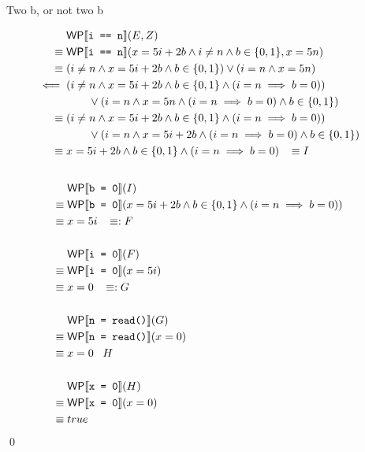 \documentclass[
  english
]{tumteaching}
\begin{document}
\begin{assignment}[L]{Two b, or not two b}
\begin{solution}
\begin{align*}
			&\;\textsf{WP}\llbracket{}\texttt{i == n}\rrbracket{}(E, Z)\\
			\equiv&\;\textsf{WP}\llbracket{}\texttt{i == n}\rrbracket{}(x = 5i + 2b \land i \neq n \land b \in \{ 0, 1 \}, x = 5n)\\
			\equiv&\;(i \neq n \land x = 5i + 2b \land b \in \{ 0, 1 \}) \lor (i = n \land x = 5n)\\
			\impliedby&\;(i \neq n \land x = 5i + 2b \land b \in \{ 0, 1 \} \land (i = n \implies b = 0))\\
			&\;\qquad \lor (i = n \land x = 5n \land (i = n \implies b = 0) \land b \in \{ 0, 1 \})\\
			\equiv&\;(i \neq n \land x = 5i + 2b \land b \in \{ 0, 1 \} \land (i = n \implies b = 0))\\
			&\;\qquad \lor (i = n \land x = 5i + 2b \land (i = n \implies b = 0) \land b \in \{ 0, 1 \})\\
			\equiv&\;x = 5i + 2b \land b \in \{ 0, 1 \} \land (i = n \implies b = 0) \;\;\; \equiv I\\
			&&\\
		\end{align*}
		\begin{align*}
			&\;\textsf{WP}\llbracket{}\texttt{b = 0}\rrbracket{}(I)\\
			\equiv&\;\textsf{WP}\llbracket{}\texttt{b = 0}\rrbracket{}(x = 5i + 2b \land b \in \{ 0, 1 \} \land (i = n \implies b = 0))\\
			\equiv&\;x = 5i \;\;\; \equiv: F\\
			&&\\
			&\;\textsf{WP}\llbracket{}\texttt{i = 0}\rrbracket{}(F)\\
			\equiv&\;\textsf{WP}\llbracket{}\texttt{i = 0}\rrbracket{}(x = 5i)\\
			\equiv&\;x = 0 \;\;\; \equiv: G\\
			&&\\
			&\;\textsf{WP}\llbracket{}\texttt{n = read()}\rrbracket{}(G)\\
			\equiv&\;\textsf{WP}\llbracket{}\texttt{n = read()}\rrbracket{}(x = 0)\\
			\equiv&\;x = 0 \;\;\; H\\
			&&\\
			&\;\textsf{WP}\llbracket{}\texttt{x = 0}\rrbracket{}(H)\\
			\equiv&\;\textsf{WP}\llbracket{}\texttt{x = 0}\rrbracket{}(x = 0)\\
			\equiv&\;true\\
		\end{align*}
		\hfill \qed


	\end{solution}
\end{assignment}
\end{document}
